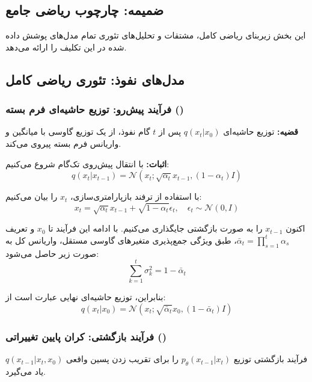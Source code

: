 \begin{latin}
\section{ضمیمه: چارچوب ریاضی جامع}
این بخش زیربنای ریاضی کامل، مشتقات و تحلیل‌های تئوری تمام مدل‌های پوشش داده شده در این تکلیف را ارائه می‌دهد.

\subsection{مدل‌های نفوذ: تئوری ریاضی کامل}

\subsubsection{فرآیند پیش‌رو: توزیع حاشیه‌ای فرم بسته ()}

\textbf{قضیه:} توزیع حاشیه‌ای $q(x_t | x_0)$ پس از $t$ گام نفوذ، از یک توزیع گاوسی با میانگین و واریانس فرم بسته پیروی می‌کند.

\textbf{اثبات:} با انتقال پیش‌روی تک‌گام شروع می‌کنیم:
\begin{equation}
q(x_t | x_{t-1}) = \mathcal{N}(x_t; \sqrt{\alpha_t} x_{t-1}, (1 - \alpha_t) I)
\end{equation}



با استفاده از ترفند بازپارامتری‌سازی، $x_t$ را بیان می‌کنیم:
\begin{equation}
x_t = \sqrt{\alpha_t} x_{t-1} + \sqrt{1 - \alpha_t} \epsilon_t, \quad \epsilon_t \sim \mathcal{N}(0, I)
\end{equation}

اکنون $x_{t-1}$ را به صورت بازگشتی جایگذاری می‌کنیم. با ادامه این فرآیند تا $x_0$ و تعریف $\bar{\alpha}_t = \prod_{s=1}^t \alpha_s$، طبق ویژگی جمع‌پذیری متغیرهای گاوسی مستقل، واریانس کل به صورت زیر حاصل می‌شود:
\begin{equation}
\sum_{k=1}^t \sigma_k^2 = 1 - \bar{\alpha}_t
\end{equation}

بنابراین، توزیع حاشیه‌ای نهایی عبارت است از:
\begin{equation}
q(x_t | x_0) = \mathcal{N}\left(x_t; \sqrt{\bar{\alpha}_t} x_0, (1 - \bar{\alpha}_t) I\right)
\end{equation}

\subsubsection{فرآیند بازگشتی: کران پایین تغییراتی ()}
فرآیند بازگشتی توزیع $p_\theta(x_{t-1} | x_t)$ را برای تقریب زدن پسین واقعی $q(x_{t-1} | x_t, x_0)$ یاد می‌گیرد.




\end{latin}
